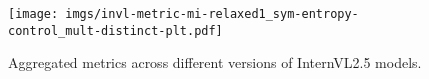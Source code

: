 \begin{figure*}[ht]
    \centering

    \texttt{[image: imgs/invl-metric-mi-relaxed1\_sym-entropy-control\_mult-distinct-plt.pdf]}

    \caption{Aggregated \mmscore{} metrics across different versions of InternVL2.5 models.}
    \label{fig:all-model-versions}
\end{figure*}
